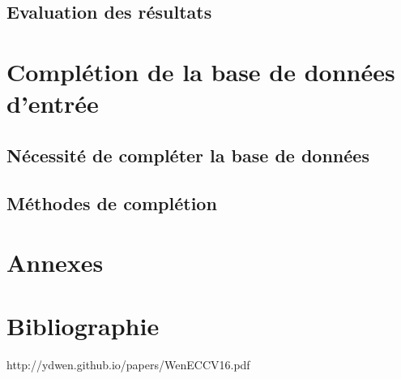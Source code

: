 \documentclass[a4paper,11pt]{article}
\begin{document}
\subsection{Evaluation des résultats}

\section{Complétion de la base de données d'entrée}
\subsection{Nécessité de compléter la base de données}
\subsection{Méthodes de complétion}

\section{Annexes}
\section{Bibliographie}
http://ydwen.github.io/papers/WenECCV16.pdf
\end{document}
